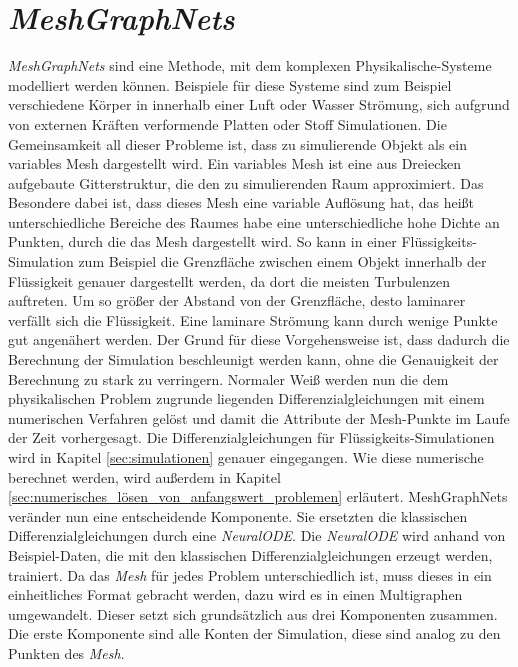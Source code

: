 

\section{\textit{MeshGraphNets}} \label{sec:meshgraphnets}

\textit{MeshGraphNets} \cite{meshgraphnets} sind eine Methode, mit dem komplexen Physikalische-Systeme modelliert werden können.
Beispiele für diese Systeme sind zum Beispiel verschiedene Körper in innerhalb einer Luft oder Wasser Strömung, 
sich aufgrund von externen Kräften verformende Platten oder Stoff Simulationen.
Die Gemeinsamkeit all dieser Probleme ist, dass zu simulierende Objekt als ein variables Mesh dargestellt wird.
Ein variables Mesh ist eine aus Dreiecken aufgebaute Gitterstruktur, die den zu simulierenden Raum approximiert.
Das Besondere dabei ist, dass dieses Mesh eine variable Auflösung hat, das heißt unterschiedliche Bereiche des Raumes 
habe eine unterschiedliche hohe Dichte an Punkten, durch die das Mesh dargestellt wird.
So kann in einer Flüssigkeits-Simulation zum Beispiel die Grenzfläche zwischen einem Objekt innerhalb der Flüssigkeit
genauer dargestellt werden, da dort die meisten Turbulenzen auftreten.
Um so größer der Abstand von der Grenzfläche, desto laminarer verfällt sich die Flüssigkeit.
Eine laminare Strömung kann durch wenige Punkte gut angenähert werden.
Der Grund für diese Vorgehensweise ist, dass dadurch die Berechnung der Simulation beschleunigt werden kann,
ohne die Genauigkeit der Berechnung zu stark zu verringern.
Normaler Weiß werden nun die dem physikalischen Problem zugrunde liegenden Differenzialgleichungen mit einem numerischen Verfahren gelöst 
und damit die Attribute der Mesh-Punkte im Laufe der Zeit vorhergesagt.
Die Differenzialgleichungen für Flüssigkeits-Simulationen wird in Kapitel \ref{sec:simulationen} genauer eingegangen.
Wie diese numerische berechnet werden, wird außerdem in Kapitel \ref{sec:numerisches_lösen_von_anfangswert_problemen} erläutert.
MeshGraphNets veränder nun eine entscheidende Komponente.
Sie ersetzten die klassischen Differenzialgleichungen durch eine \textit{NeuralODE}.
Die \textit{NeuralODE} wird anhand von Beispiel-Daten, die mit den klassischen Differenzialgleichungen erzeugt werden, trainiert.
Da das \textit{Mesh} für jedes Problem unterschiedlich ist, muss dieses in ein einheitliches Format gebracht werden, dazu wird es in einen
Multigraphen umgewandelt.
Dieser setzt sich grundsätzlich aus drei Komponenten zusammen.
Die erste Komponente sind alle Konten der Simulation, diese sind analog zu den Punkten des \textit{Mesh}.
